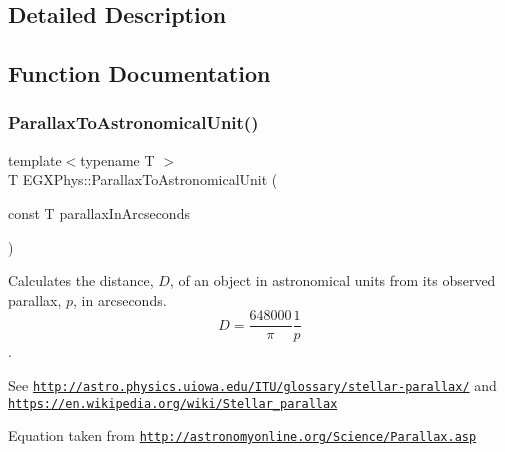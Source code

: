 \subsection{Detailed Description}


\subsection{Function Documentation}
\mbox{\label{group___e_g_x_phys-_astrophysic-_parallax_gaee6df9899f30baa3d659597abe89066a}} 
\subsubsection{\texorpdfstring{Parallax\+To\+Astronomical\+Unit()}{ParallaxToAstronomicalUnit()}}
{\footnotesize\ttfamily template$<$typename T $>$ \\
T E\+G\+X\+Phys\+::\+Parallax\+To\+Astronomical\+Unit (\begin{DoxyParamCaption}\item[{const T}]{parallax\+In\+Arcseconds }\end{DoxyParamCaption})}



Calculates the distance, $D$, of an object in astronomical units from its observed parallax, $p$, in arcseconds. \[ D=\dfrac{648000}{\pi}\dfrac{1}{p}\]. 

See \href{http://astro.physics.uiowa.edu/ITU/glossary/stellar-parallax/}{\tt http\+://astro.\+physics.\+uiowa.\+edu/\+I\+T\+U/glossary/stellar-\/parallax/} and \href{https://en.wikipedia.org/wiki/Stellar_parallax}{\tt https\+://en.\+wikipedia.\+org/wiki/\+Stellar\+\_\+parallax}

Equation taken from \href{http://astronomyonline.org/Science/Parallax.asp}{\tt http\+://astronomyonline.\+org/\+Science/\+Parallax.\+asp}



